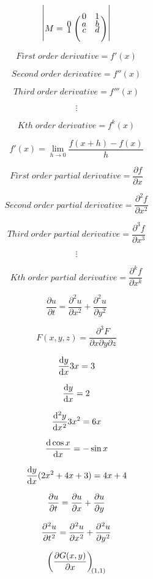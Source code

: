 \documentclass[a4paper,12pt]{article}
\begin{document}
\begin{center}
\color{orange}
\[
	\begin{vmatrix}
	M=\bordermatrix{~ & 0 & 1 \cr
	0 & a & b \cr
	1 & c & d \cr}
	\end{vmatrix}
\]

\color{blue}
\[
	First \;  order \; derivative = f'(x) %
\]

\[
	Second \; order \; derivative = f''(x) %
\]

\[
	Third \; order \; derivative = f'''(x)
\]

\[
	\vdots
\]

\[
	Kth \; order \; derivative =f^{k}(x)
\]

\[
	f'(x)=\lim\limits_{h \rightarrow 0} \frac{f(x+h)-f(x)}{h}	
\]

\[
	First\; order \; partial \; derivative = \frac{\partial f}{\partial x}
\]

\[
	Second\; order \; partial \; derivative = \frac{\partial^2 f}{\partial x^2}
\]

\[
	Third \; order \; partial  \; derivative =\frac{\partial^3 f}{\partial x^3}
\]

\[
	\vdots
\]

\[
	Kth \; order \; partial \; derivative =\frac{\partial^k f}{\partial x^k}
\]

\[
	\frac{\partial u}{\partial t} = \frac{\partial^2 u}{\partial x^2} + \frac{\partial^2 u}{\partial y^2}
\]



\[
	F(x,y,z) = \frac{\partial^3 F}{\partial x \partial y \partial z}
\]


\[
	\diff[1]yx 3x = 3
\]

\[
	\diff{y}{x} = 2
\]

\[
	\diff[2]yx 3x^2 = 6x
\]

\[
	\diff{\cos x}x = -\sin x
\]

\[
	\diff[1]yx (2x^2 + 4x + 3) = 4x + 4
\]


\[
	\diffp{u}{t} = \diffp{u}{x} + \diffp{u}{y}
\]


\[
	\diffp[2]ut = \diffp[2]ux + \diffp[2]uy
\]

\[
	\diffp {G(x,y)}x[(1,1)]
\]


\end{center}
\end{document}
